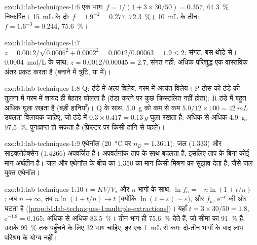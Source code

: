 \begin{solution}{exo:b1:lab-techniques-1:6}
एक भाग: $f = 1/(1 + 3 \times 30/50) = 0.357$, \qty{64.3}{\percent}
निष्कर्षित। \qty{15}{mL} के दो: $f = 1.9^{-2} = 0.277$,
\qty{72.3}{\percent}। \qty{10}{mL} के तीन: $f = 1.6^{-3} = 0.244$,
\qty{75.6}{\percent}।
\end{solution}

\begin{solution}{exo:b1:lab-techniques-1:7}
$z = 0.0012/\sqrt{0.0006^2 + 0.0002^2} = 0.0012/0.00063 = 1.9 \le 2$:
संगत, बस थोड़े से। \qty{0.0004}{mol/L} के साथ: $z = 0.0012/0.00045 = 2.7$,
संगत नहीं: अधिक परिशुद्ध  एक वास्तविक अंतर प्रकट करता है
(बनाने में त्रुटि, या  में)।
\end{solution}

\begin{solution}{exo:b1:lab-techniques-1:8}
Q: ठंडे में अल्प विलेय, गरम में अत्यंत विलेय। P ठोस को ठंडे की तुलना में गरम में
शायद ही बेहतर घोलता है (ठंडा करने पर कुछ क्रिस्टलित नहीं होता); R ठंडे में बहुत अधिक
घुला रखता है (बड़ी हानियाँ)। Q के साथ, \qty{5.0}{g} को कम से कम
$5.0/12 \times 100 = \qty{42}{mL}$ उबलता विलायक चाहिए, जो
ठंडे में $0.3 \times 0.417 = \qty{0.13}{g}$ घुला रखता है: अधिक से अधिक
\qty{4.9}{g}, \qty{97.5}{\percent}, पुनःप्राप्त हो सकता है (फ़िल्टर पर किसी हानि से
पहले)।
\end{solution}

\begin{solution}{exo:b1:lab-techniques-1:9}
एथेनॉल (\qty{20}{\celsius} पर $n_D = 1.3611$); जल (1.333) और
साइक्लोहेक्सेन (1.4266) अपवर्जित हैं। अपवर्तनांक ताप के साथ बदलता है,
इसलिए ताप के बिना कोई मान अर्थहीन है। जल और एथेनॉल के बीच का
1.350 का मान किसी मिश्रण का सुझाव देता है, जैसे जल युक्त एथेनॉल।
\end{solution}

\begin{solution}{exo:b1:lab-techniques-1:10}
$t = KV/V_a$ और $n$ भागों के साथ, $\ln f_n = -n\ln(1 + t/n)$; जब
$n \to \infty$, तब $n \ln(1 + t/n) \to t$ (क्योंकि $\ln(1 + \varepsilon) \sim
\varepsilon$), और $f_n$, $\mathrm{e}^{-t}$ की ओर घटता है (\cref{prop:b1:lab-techniques-1:multiple-extractions})।
यहाँ $t = 3 \times 30/50 = 1.8$, $\mathrm{e}^{-1.8} = 0.165$: अधिक से अधिक
\qty{83.5}{\percent}। तीन भाग ही \qty{75.6}{\percent} देते हैं, जो सीमा का
\qty{91}{\percent} है; उसके \qty{99}{\percent} तक पहुँचने के लिए 32
भाग चाहिए, हर एक \qty{1}{mL} से कम: दो-तीन भागों के बाद लाभ
परिश्रम के योग्य नहीं।
\end{solution}

